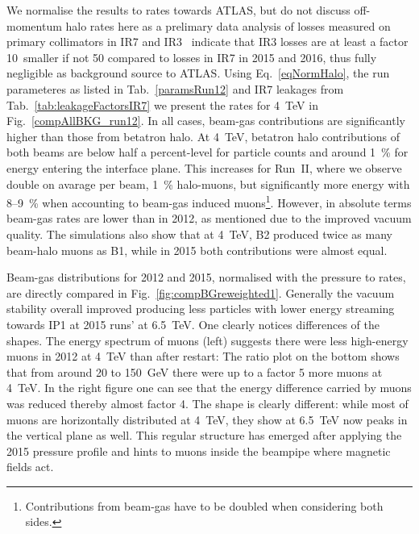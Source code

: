 We normalise the results to rates towards ATLAS, but do not discuss off-momentum halo rates here as a prelimary data analysis of losses measured on primary collimators in IR7 and IR3~\cite{belenOffMom} indicate that IR3 losses are at least a factor 10~smaller if not 50 compared to losses in IR7 in 2015 and 2016, thus fully negligible as background source to ATLAS. Using Eq.~\ref{eqNormHalo}, the run parameteres as listed in Tab.~\ref{paramsRun12} and IR7 leakages from Tab.~\ref{tab:leakageFactorsIR7} we present the rates for 4~TeV in Fig.~\ref{compAllBKG_run12}. In all cases, beam-gas contributions are significantly higher than those from betatron halo. At 4~TeV, betatron halo contributions of both beams are below half a percent-level for particle counts and around 1~\% for energy entering the interface plane. This increases for Run~II, where we observe double on avarage per beam, 1~\% halo-muons, but significantly more energy with 8--9~\% when accounting to beam-gas induced muons\footnote{Contributions from beam-gas have to be doubled when considering both sides.}. However, in absolute terms beam-gas rates are lower than in 2012, as mentioned due to the improved vacuum quality. The simulations also show that at 4~TeV, B2 produced twice as many beam-halo muons as B1, while in 2015 both contributions were almost equal. 

Beam-gas distributions for 2012 and 2015, normalised with the pressure to rates, are directly compared in Fig.~\ref{fig:compBGreweighted1}. Generally the vacuum stability overall improved producing less particles with lower energy streaming towards IP1 at 2015 runs' at 6.5~TeV. One clearly notices differences of the shapes. The energy spectrum of muons (left) suggests there were less high-energy muons in 2012 at 4~TeV than after restart: The ratio plot on the bottom shows that from around 20 to 150~GeV there were up to a factor 5 more muons at 4~TeV. In the right figure one can see that the energy difference carried by muons was reduced thereby almost factor 4. The shape is clearly different: while most of muons are horizontally distributed at 4~TeV, they show at 6.5~TeV now peaks in the vertical plane as well. This regular structure has emerged after applying the 2015 pressure profile and hints to muons inside the beampipe where magnetic fields act.

